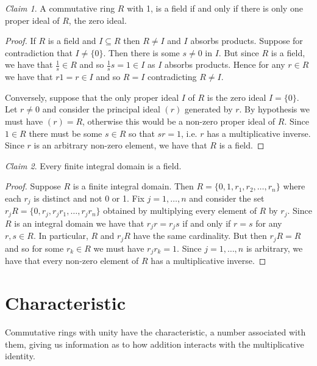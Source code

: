 \documentclass[12pt,letterpaper,DIV=11,final]{scrartcl}
\theoremstyle{plain}
\theoremstyle{definition}
\theoremstyle{remark}
\newtheorem{claim}{Claim}
\begin{document}
\begin{claim}
  A commutative ring $R$ with 1, is a field if and only if there is only one proper ideal of $R$, the zero ideal.

  \begin{proof}
    If $R$ is a field and $I \subseteq R$ then $R \neq I$ and $I$ absorbs products.
    Suppose for contradiction that $I \neq \{ 0 \}$.
    Then there is some $s \neq 0$ in $I$.
    But since $R$ is a field, we have that $\frac{1}{s} \in R$ and so $\frac{1}{s} s = 1 \in I$ as $I$ absorbs products.
    Hence for any $r \in R$ we have that $r1 = r \in I$ and so $R = I$ contradicting $R \neq I$.

    Conversely, suppose that the only proper ideal $I$ of $R$ is the zero ideal $I = \{ 0 \}$.
    Let $r \neq 0$ and consider the principal ideal $(r)$ generated by $r$.
    By hypothesis we must have $(r) = R$, otherwise this would be a non-zero proper ideal of $R$.
    Since $1 \in R$ there must be some $s \in R$ so that $sr = 1$, i.e. $r$ has a multiplicative inverse.
    Since $r$ is an arbitrary non-zero element, we have that $R$ is a field.
  \end{proof}
\end{claim}

\begin{claim}
  Every finite integral domain is a field.

  \begin{proof}
    Suppose $R$ is a finite integral domain.
    Then $R = \{ 0, 1, r_1, r_2, \dots, r_n \}$ where each $r_j$ is distinct and not 0 or 1.
    Fix $j = 1, \dots, n$ and consider the set $r_j R = \{ 0, r_j, r_j r_1, \dots, r_j r_n \}$ obtained by multiplying every element of $R$ by $r_j$.
    Since $R$ is an integral domain we have that $r_j r = r_j s$ if and only if $r = s$ for any $r, s \in R$.
    In particular, $R$ and $r_j R$ have the same cardinality.
    But then $r_j R = R$ and so for some $r_k \in R$ we must have $r_j r_k = 1$.
    Since $j = 1, \dots, n$ is arbitrary, we have that every non-zero element of $R$ has a multiplicative inverse.
  \end{proof}
\end{claim}

\section{Characteristic}

Commutative rings with unity have the characteristic, a number associated with them,
giving us information as to how addition interacts with the multiplicative identity.
\end{document}

